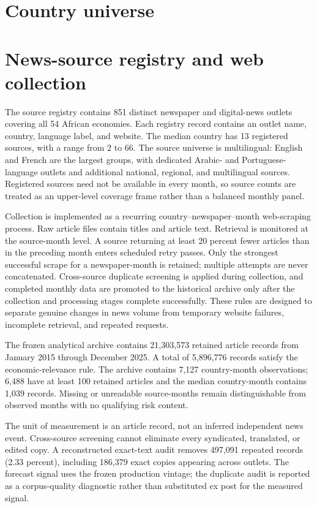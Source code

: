 \documentclass[12pt]{article}
\begin{document}
\section{Country universe}



\section{News-source registry and web collection}
The source registry contains 851 distinct newspaper and digital-news outlets covering all 54 African economies. Each registry record contains an outlet name, country, language label, and website. The median country has 13 registered sources, with a range from 2 to 66. The source universe is multilingual: English and French are the largest groups, with dedicated Arabic- and Portuguese-language outlets and additional national, regional, and multilingual sources. Registered sources need not be available in every month, so source counts are treated as an upper-level coverage frame rather than a balanced monthly panel.

Collection is implemented as a recurring country--newspaper--month web-scraping process. Raw article files contain titles and article text. Retrieval is monitored at the source-month level. A source returning at least 20 percent fewer articles than in the preceding month enters scheduled retry passes. Only the strongest successful scrape for a newspaper-month is retained; multiple attempts are never concatenated. Cross-source duplicate screening is applied during collection, and completed monthly data are promoted to the historical archive only after the collection and processing stages complete successfully. These rules are designed to separate genuine changes in news volume from temporary website failures, incomplete retrieval, and repeated requests.

The frozen analytical archive contains 21,303,573 retained article records from January 2015 through December 2025. A total of 5,896,776 records satisfy the economic-relevance rule. The archive contains 7,127 country-month observations; 6,488 have at least 100 retained articles and the median country-month contains 1,039 records. Missing or unreadable source-months remain distinguishable from observed months with no qualifying risk content.

The unit of measurement is an article record, not an inferred independent news event. Cross-source screening cannot eliminate every syndicated, translated, or edited copy. A reconstructed exact-text audit removes 497,091 repeated records (2.33 percent), including 186,379 exact copies appearing across outlets. The forecast signal uses the frozen production vintage; the duplicate audit is reported as a corpus-quality diagnostic rather than substituted ex post for the measured signal.
\end{document}
